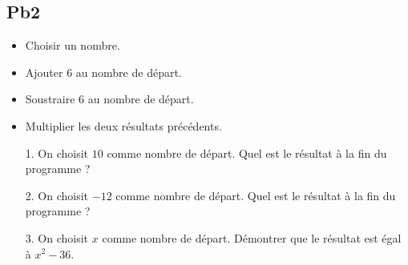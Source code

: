 \vspace{1cm}

\begin{multicols}{2}

\subsection*{Pb2}

\begin{itemize}[label={$\bullet$}]
  \item Choisir un nombre.
  \item Ajouter 6 au nombre de départ. 
  \item Soustraire 6 au nombre de départ.
  \item Multiplier les deux résultats précédents.
\end{itemize}  \columnbreak

\begin{enumerate}
  \item[1.] On choisit $10$ comme nombre de départ. \newline Quel est le résultat à la fin du programme ?
  \item[2.] On choisit $-12$ comme nombre de départ. \newline Quel est le résultat à la fin du programme ?
  \item[3.] On choisit $x$ comme nombre de départ. \newline Démontrer que le résultat est égal à $x^2 - 36$. 
\end{enumerate}
\end{multicols}


